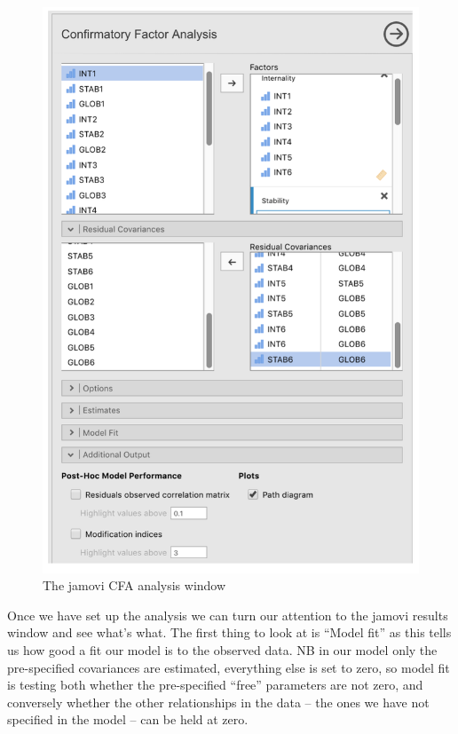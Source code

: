 \documentclass[
]{book}
\begin{document}
\begin{figure}

{\centering \includegraphics[width=1\linewidth]{img/factoranalysis/MTMM5} 

}

\caption{The jamovi CFA analysis window}\label{fig:MTMM5}
\end{figure}

Once we have set up the analysis we can turn our attention to the jamovi results window and see what's what. The first thing to look at is ``Model fit'' as this tells us how good a fit our model is to the observed data. NB in our model only the pre-specified covariances are estimated, everything else is set to zero, so model fit is testing both whether the pre-specified ``free'' parameters are not zero, and conversely whether the other relationships in the data -- the ones we have not specified in the model -- can be held at zero.
\end{document}

